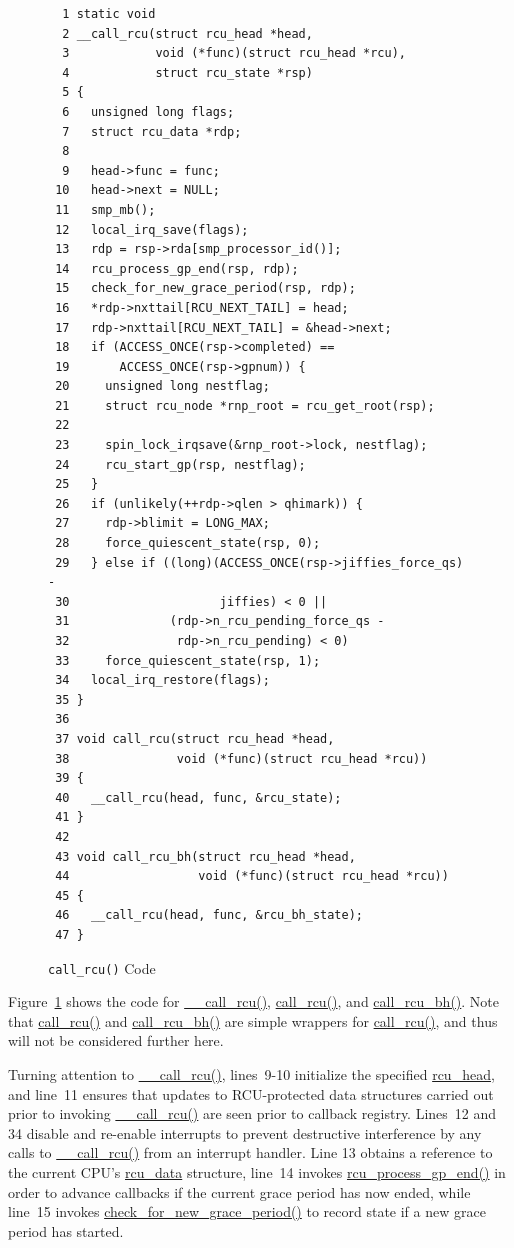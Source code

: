 \begin{figure}[tbp]
{ \scriptsize
\begin{verbatim}
  1 static void
  2 __call_rcu(struct rcu_head *head,
  3            void (*func)(struct rcu_head *rcu),
  4            struct rcu_state *rsp)
  5 {
  6   unsigned long flags;
  7   struct rcu_data *rdp;
  8 
  9   head->func = func;
 10   head->next = NULL;
 11   smp_mb();
 12   local_irq_save(flags);
 13   rdp = rsp->rda[smp_processor_id()];
 14   rcu_process_gp_end(rsp, rdp);
 15   check_for_new_grace_period(rsp, rdp);
 16   *rdp->nxttail[RCU_NEXT_TAIL] = head;
 17   rdp->nxttail[RCU_NEXT_TAIL] = &head->next;
 18   if (ACCESS_ONCE(rsp->completed) ==
 19       ACCESS_ONCE(rsp->gpnum)) {
 20     unsigned long nestflag;
 21     struct rcu_node *rnp_root = rcu_get_root(rsp);
 22 
 23     spin_lock_irqsave(&rnp_root->lock, nestflag);
 24     rcu_start_gp(rsp, nestflag);
 25   }
 26   if (unlikely(++rdp->qlen > qhimark)) {
 27     rdp->blimit = LONG_MAX;
 28     force_quiescent_state(rsp, 0);
 29   } else if ((long)(ACCESS_ONCE(rsp->jiffies_force_qs) -
 30                     jiffies) < 0 ||
 31              (rdp->n_rcu_pending_force_qs -
 32               rdp->n_rcu_pending) < 0)
 33     force_quiescent_state(rsp, 1);
 34   local_irq_restore(flags);
 35 }
 36 
 37 void call_rcu(struct rcu_head *head,
 38               void (*func)(struct rcu_head *rcu))
 39 {
 40   __call_rcu(head, func, &rcu_state);
 41 }
 42 
 43 void call_rcu_bh(struct rcu_head *head,
 44                  void (*func)(struct rcu_head *rcu))
 45 {
 46   __call_rcu(head, func, &rcu_bh_state);
 47 }
\end{verbatim}
}
\caption{{\tt call\_rcu()} Code}
\label{fig:app:rcuimpl:rcutreewt:Code for rcutree call-rcu}
\end{figure}

Figure~\ref{fig:app:rcuimpl:rcutreewt:Code for rcutree call-rcu}
shows the code for \url{__call_rcu()}, \url{call_rcu()}, and
\url{call_rcu_bh()}.
Note that \url{call_rcu()} and \url{call_rcu_bh()} are simple wrappers
for \url{call_rcu()}, and thus will not be considered further here.

Turning attention to \url{__call_rcu()}, lines~9-10 initialize the
specified \url{rcu_head}, and line~11 ensures that updates to
RCU-protected data structures carried out prior to invoking
\url{__call_rcu()} are seen prior to callback registry.
Lines~12 and 34 disable and re-enable interrupts to prevent destructive
interference by any calls to \url{__call_rcu()} from an interrupt
handler.
Line 13 obtains a reference to the current CPU's \url{rcu_data}
structure, line~14 invokes \url{rcu_process_gp_end()} in order
to advance callbacks if the current grace period has now ended,
while line~15 invokes \url{check_for_new_grace_period()} to
record state if a new grace period has started.

